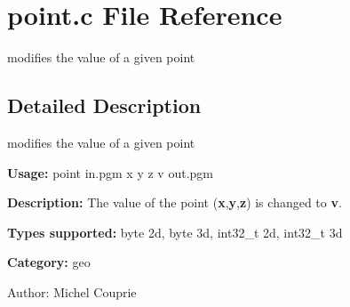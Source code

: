 \section{point.c File Reference}
\label{point_8c}
modifies the value of a given point 



\subsection{Detailed Description}
modifies the value of a given point 

{\bf Usage:} point in.pgm x y z v out.pgm

{\bf Description:} The value of the point ({\bf x},{\bf y},{\bf z}) is changed to {\bf v}.

{\bf Types supported:} byte 2d, byte 3d, int32\_\-t 2d, int32\_\-t 3d

{\bf Category:} geo

\begin{Desc}
\item[Author:]Michel Couprie \end{Desc}
